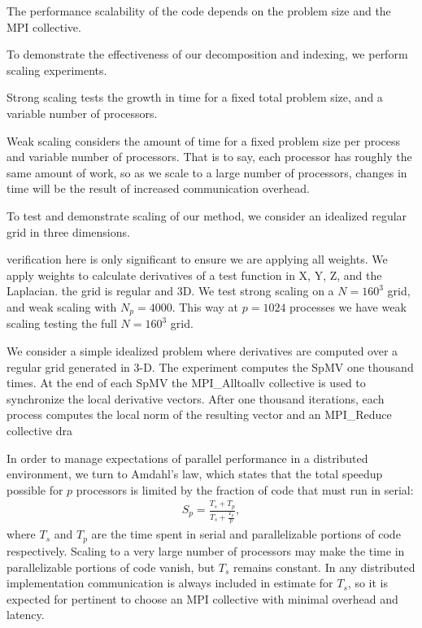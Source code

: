 \documentclass{report}
\begin{document}


The performance scalability of the code depends on the problem size and the MPI collective. 

To demonstrate the effectiveness of our decomposition and indexing, we perform scaling experiments. 

Strong scaling tests the growth in time for a fixed total problem size, and a variable number of processors. 

Weak scaling considers the amount of time for a fixed problem size per process and variable number of processors. That is to say, each processor has roughly the same amount of work, so as we scale to a large number of processors, changes in time will be the result of increased communication overhead. 


To test and demonstrate scaling of our method, we consider an idealized regular grid in three dimensions. 

verification here is only significant to ensure we are applying all weights. 
We apply weights to calculate derivatives of a test function in X, Y, Z, and the Laplacian. 
the grid is regular and 3D.
We test strong scaling on a $N=160^3$ grid, and weak scaling with $N_p=4000$. This way at $p=1024$ processes we have weak scaling testing the full $N=160^3$ grid. 

We consider a simple idealized problem where derivatives are computed over a regular grid generated in 3-D. The experiment computes the SpMV one thousand times. At the end of each SpMV the MPI\_Alltoallv collective is used to synchronize the local derivative vectors. After one thousand iterations, each process computes the local norm of the resulting vector and an MPI\_Reduce collective dra




In order to manage expectations of parallel performance in a distributed environment, we turn to Amdahl's law, which states that the total speedup possible for $p$ processors is limited by the fraction of code that must run in serial:
\begin{align}
S_p = \frac{T_s + T_p}{T_s + \frac{T_p}{p}},  \nonumber
\end{align}
where $T_s$ and $T_p$ are the time spent in serial and parallelizable portions of code respectively. Scaling to a very large number of processors may make the time in parallelizable portions of code vanish, but $T_s$ remains constant. In any distributed implementation communication is always included in estimate for $T_s$, so it is expected for  pertinent to choose an MPI collective with minimal overhead and latency. 
\end{document}
